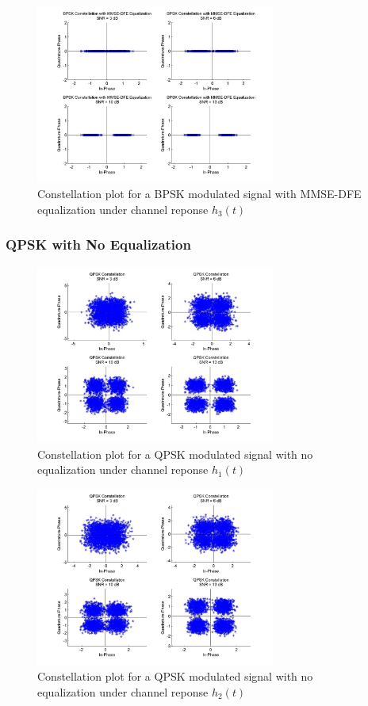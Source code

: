 \documentclass[]{article}
\begin{document}
\begin{figure}[H]
\centering
\includegraphics[width=0.7\textwidth]{bpConstMMSEDFE3.jpg}
\caption{Constellation plot for a BPSK modulated signal with MMSE-DFE equalization under channel reponse $h_3(t)$}
\end{figure}


\subsubsection{QPSK with No Equalization}

\begin{figure}[H]
\centering
\includegraphics[width=0.7\textwidth]{qpConst1.jpg}
\caption{Constellation plot for a QPSK modulated signal with no equalization under channel reponse $h_1(t)$}
\end{figure}

\begin{figure}[H]
\centering
\includegraphics[width=0.7\textwidth]{qpConst2.jpg}
\caption{Constellation plot for a QPSK modulated signal with no equalization under channel reponse $h_2(t)$}
\end{figure}
\end{document}

